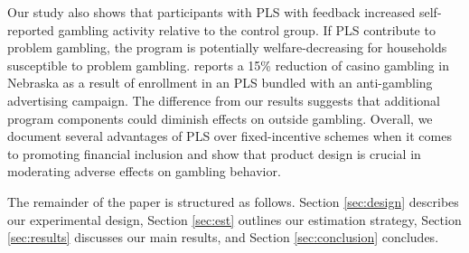 \documentclass[11pt]{article}
\begin{document}
	Our study also shows that participants with PLS with feedback increased self-reported gambling activity relative to the control group. If PLS contribute to problem gambling, the program is potentially welfare-decreasing for households susceptible to problem gambling. \textcite{cookson_when_2016} reports a 15\% reduction of casino gambling in Nebraska as a result of enrollment in an PLS bundled with an anti-gambling advertising campaign. The difference from our results suggests that additional program components could diminish effects on outside gambling. Overall, we document several advantages of PLS over fixed-incentive schemes when it comes to promoting financial inclusion and show that product design is crucial in moderating adverse effects on gambling behavior.


	The remainder of the paper is structured as follows. Section \ref{sec:design} describes our experimental design, Section \ref{sec:est} outlines our estimation strategy, Section \ref{sec:results} discusses our main results, and Section \ref{sec:conclusion} concludes.





\end{document}
